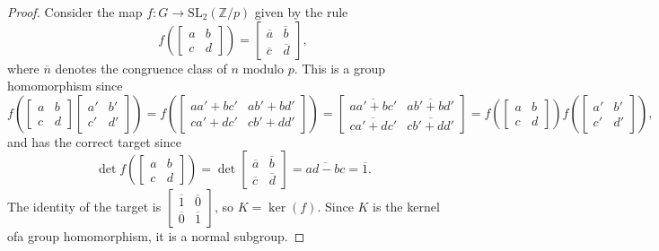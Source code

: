 \documentclass[11pt]{article}
\newcommand{\ZZ}{\mathbb{Z}}
\theoremstyle{definition}
\begin{document}
      \begin{proof}
      Consider the map $f: G \to \mathrm{SL}_2(\ZZ/p)$ given by the rule \[ f \left(\begin{bmatrix} a & b \\ c & d\end{bmatrix} \right) = \begin{bmatrix} \overline{a} & \overline{b} \\ \overline{c} & \overline{d}\end{bmatrix},\]
      where $\overline{n}$ denotes the congruence class of $n$ modulo $p$. This is a group homomorphism since 
      \[f \left(\begin{bmatrix} a & b \\ c & d\end{bmatrix} \begin{bmatrix} a' & b' \\ c' & d'\end{bmatrix} \right)  = f  \left(\begin{bmatrix} aa' + bc' & ab' + bd'  \\ ca'+dc' & cb'+dd' \end{bmatrix}\right)  =\begin{bmatrix} \overline{aa' + bc'} & \overline{ab' + bd'}  \\ \overline{ca'+dc'} & \overline{cb'+dd'} \end{bmatrix} = f \left(\begin{bmatrix} a & b \\ c & d\end{bmatrix} \right)  f \left(\begin{bmatrix} a' & b' \\ c' & d'\end{bmatrix} \right), \] 
      and has the correct target since
       \[  \det f \left(\begin{bmatrix} a & b \\ c & d\end{bmatrix} \right) = \det \begin{bmatrix} \overline{a} & \overline{b} \\ \overline{c} & \overline{d}\end{bmatrix} = \overline{ad-bc} = \overline{1}.\]
The identity of the target is $\begin{bmatrix} \overline{1} & \overline{0} \\ \overline{0} & \overline{1}\end{bmatrix}$, so $K=\ker(f)$. Since $K$ is the kernel ofa  group homomorphism, it is a normal subgroup.
      
            \end{proof}
      
\end{document}
